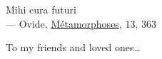 \cleardoublepage
\thispagestyle{empty}


\vspace*{3cm}

\begin{raggedleft}
    	Mihi cura futuri\\
     --- Ovide, \underline{Métamorphoses}, 13, 363\\
\end{raggedleft}

\vspace{4cm}

\begin{center}
    To my friends and loved ones\dots
\end{center}


